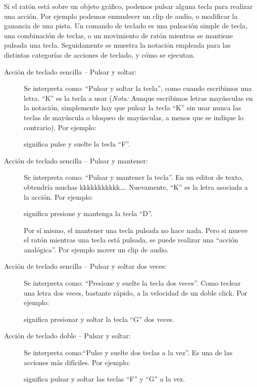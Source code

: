 ﻿Si el ratón está sobre un objeto gráfico, podemos pulsar alguna tecla para realizar una acción. Por ejemplo podemos enmudecer un clip de audio, o modificar la ganancia de una pista. Un comando de teclado es una pulsación simple de tecla, una combinación de teclas, o un movimiento de ratón mientras se mantiene pulsada una tecla. Seguidamente se muestra la notación empleada para las distintas categorías de acciones de teclado, y cómo se ejecutan.

\begin{description}
\item[Acción de teclado sencilla  -- Pulsar y soltar:]
Se interpreta como: ``Pulsar y soltar la tecla'', como cuando escribimos una letra.
``K'' es la tecla a usar (\emph{Nota:} Aunque escribimos letras mayúsculas en la notación, simplemente hay que pulsar la tecla ``K'' sin usar nunca las teclas de mayúscula o bloqueo de mayúsculas, a menos que se indique lo contrario). Por ejemplo:
\begin{quotation}
\end{quotation}
significa pulse y suelte la tecla ``F''.

\item[Acción de teclado sencilla  -- Pulsar y mantener:]
Se interpreta como: ``Pulsar y mantener la tecla''. En un editor de texto, obtendría muchas kkkkkkkkkkk\dots.
Nuevamente, ``K'' es la letra asociada a la acción. Por ejemplo:
\begin{quotation}
\end{quotation}
significa presione y mantenga la tecla ``D''.

Por sí mismo, el mantener una tecla pulsada no hace nada. Pero si mueve el ratón mientras una tecla está pulsada, se puede realizar una ``acción analógica''. Por ejemplo mover un clip de audio.

\item[Acción de teclado sencilla  -- Pulsar y soltar dos veces:]
Se interpreta como: ``Presione y suelte la tecla dos veces''. Como teclear una letra dos veces, bastante rápido, a la velocidad de un doble click. Por ejemplo:
\begin{quotation}
\end{quotation}
significa presionar y soltar la tecla ``G'' dos veces.

\item[Acción de teclado doble  -- Pulsar y soltar:]
Se interpreta como:``Pulse y suelte dos teclas a la vez''. Es una de las acciones más difíciles. Por ejemplo:
\begin{quotation}
\end{quotation}
significa pulsar y soltar las teclas ``F'' y ``G'' a la vez.


\end{description}
